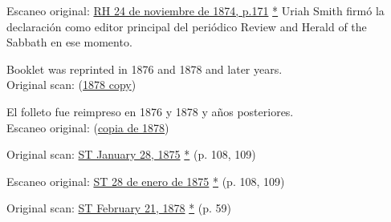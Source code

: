 Escaneo original: \href{https://documents.adventistarchives.org/Periodicals/RH/RH18741124-V44-22.pdf}{RH 24 de noviembre de 1874, p.171} \href{https://forgotten-pillar.s3.us-east-2.amazonaws.com/RH18741124-V44-22.pdf}{*} Uriah Smith firmó la declaración como editor principal del periódico Review and Herald of the Sabbath en ese momento.






Booklet was reprinted in 1876 and 1878 and later years. \\
Original scan: (\href{https://adventistdigitallibrary.org/islandora/object/adl%3A22250872?solr_nav%5Bid%5D=a09d3902c2540c98eb7f&solr_nav%5Bpage%5D=56&solr_nav%5Boffset%5D=3}{1878 copy})


El folleto fue reimpreso en 1876 y 1878 y años posteriores. \\
Escaneo original: (\href{https://adventistdigitallibrary.org/islandora/object/adl%3A22250872?solr_nav%5Bid%5D=a09d3902c2540c98eb7f&solr_nav%5Bpage%5D=56&solr_nav%5Boffset%5D=3}{copia de 1878})






Original scan: \href{https://documents.adventistarchives.org/Periodicals/ST/ST18750128-V01-14.pdf#search=ST18750128}{ST January 28, 1875} \href{https://forgotten-pillar.s3.us-east-2.amazonaws.com/ST18750128-V01-14.pdf}{*} (p. 108, 109)


Escaneo original: \href{https://documents.adventistarchives.org/Periodicals/ST/ST18750128-V01-14.pdf#search=ST18750128}{ST 28 de enero de 1875} \href{https://forgotten-pillar.s3.us-east-2.amazonaws.com/ST18750128-V01-14.pdf}{*} (p. 108, 109)






Original scan: \href{https://documents.adventistarchives.org/Periodicals/ST/ST18780221-V04-08.pdf#search=%22As%20already%20stated%2C%20S%2E%20D%2E%20Adventists%22}{ST February 21, 1878} \href{https://forgotten-pillar.s3.us-east-2.amazonaws.com/ST18780221-V04-08.pdf}{*} (p. 59)


